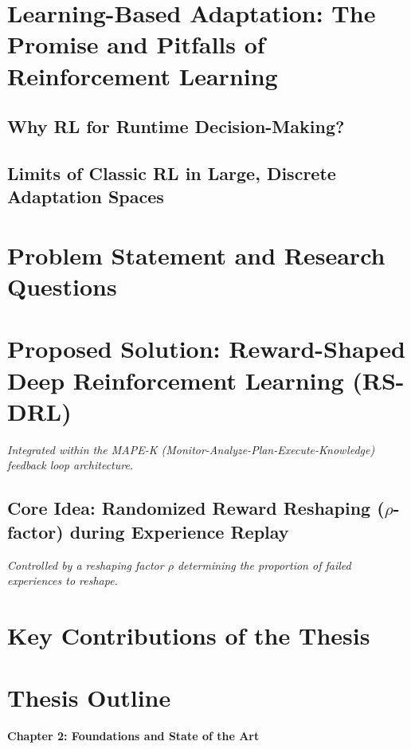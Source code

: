 \documentclass[11pt,a4paper]{article}
\begin{document}
\section{Learning-Based Adaptation: The Promise and Pitfalls of Reinforcement Learning}
\subsection{Why RL for Runtime Decision-Making?}
\subsection{Limits of Classic RL in Large, Discrete Adaptation Spaces}

\section{Problem Statement and Research Questions}
\section{Proposed Solution: Reward-Shaped Deep Reinforcement Learning (RS-DRL)}
\textit{Integrated within the MAPE-K (Monitor-Analyze-Plan-Execute-Knowledge) feedback loop architecture.}

\subsection{Core Idea: Randomized Reward Reshaping ($\rho$-factor) during Experience Replay}
\textit{Controlled by a reshaping factor $\rho$ determining the proportion of failed experiences to reshape.}

\section{Key Contributions of the Thesis}
\section{Thesis Outline}

\newpage

\vspace*{1cm}
{\centering \huge \textbf{Chapter 2: Foundations and State of the Art} \par}
\vspace{1cm}
\end{document}
